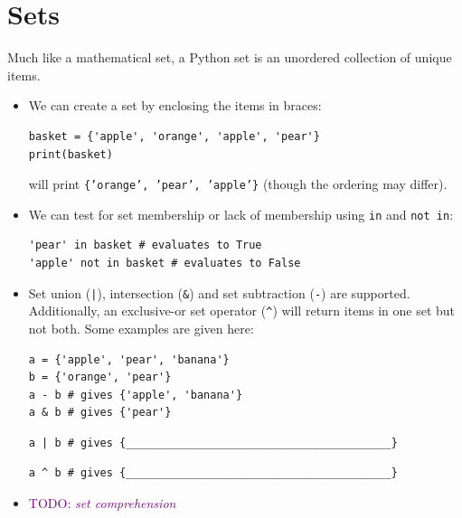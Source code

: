 \documentclass[a4paper,twoside,titlepage]{memoir}
\newcommand{\shellcmd}{\texttt}
\newcommand{\TODO}[1]{\textcolor{purple}{TODO: \emph{#1}}}
\begin{document}
\section{Sets}
Much like a mathematical set, a Python set is an unordered collection of unique items.
\begin{itemize}
\item We can create a set by enclosing the items in braces:
\begin{verbatim}
basket = {'apple', 'orange', 'apple', 'pear'}
print(basket)
\end{verbatim}
will print \shellcmd{\{'orange', 'pear', 'apple'\}} (though the ordering may differ).
\item We can test for set membership or lack of membership using \shellcmd{in} and \shellcmd{not in}:
\begin{verbatim}
'pear' in basket # evaluates to True
'apple' not in basket # evaluates to False
\end{verbatim}

\item Set union (\shellcmd{|}), intersection (\shellcmd{\&}) and set subtraction (\shellcmd{-}) are supported.  Additionally, an exclusive-or set operator (\shellcmd{\^}) will return items in one set but not both.  Some examples are given here:
\begin{verbatim}
a = {'apple', 'pear', 'banana'}
b = {'orange', 'pear'}
a - b # gives {'apple', 'banana'}
a & b # gives {'pear'}
\end{verbatim}
\begin{verbatim}
a | b # gives {_________________________________________}
\end{verbatim}
\begin{verbatim}
a ^ b # gives {_________________________________________}
\end{verbatim}

\item \TODO{set comprehension}
\end{itemize}
\end{document}
